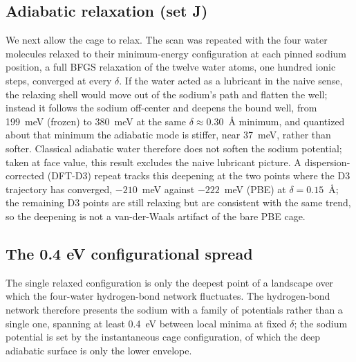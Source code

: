 \documentclass[aps,10pt,preprint,superscriptaddress,floatfix]{revtex4-2}
\begin{document}
\subsection{Adiabatic relaxation (set J)}

We next allow the cage to relax. The scan was repeated with the four water molecules relaxed to
their minimum-energy configuration at each pinned sodium position, a full BFGS relaxation of the
twelve water atoms, one hundred ionic steps, converged at every $\delta$. If the water acted as a
lubricant in the naive sense, the relaxing shell would move out of the sodium's path and flatten
the well; instead it follows the sodium off-center and deepens the bound well, from 199~meV
(frozen) to 380~meV at the same $\delta\approx0.30$~\AA{} minimum, and quantized about that minimum
the adiabatic mode is stiffer, near 37~meV, rather than softer. Classical adiabatic water therefore
does not soften the sodium potential; taken at face value, this result excludes the naive lubricant
picture. A
dispersion-corrected (DFT-D3) repeat tracks this deepening at the two points where the D3
trajectory has converged, $-210$~meV against $-222$~meV (PBE) at $\delta=0.15$~\AA; the remaining D3
points are still relaxing but are consistent with the same trend, so the deepening is not a
van-der-Waals artifact of the bare PBE cage.

\subsection{The 0.4 eV configurational spread}

The single relaxed configuration is only the deepest point of a landscape over which the four-water
hydrogen-bond network fluctuates.  The hydrogen-bond network therefore
presents the sodium with a family of potentials rather than a single one, spanning at least 0.4~eV
between local minima at fixed $\delta$; the sodium potential is set by the instantaneous cage
configuration, of which the deep adiabatic surface is only the lower envelope.
\end{document}
